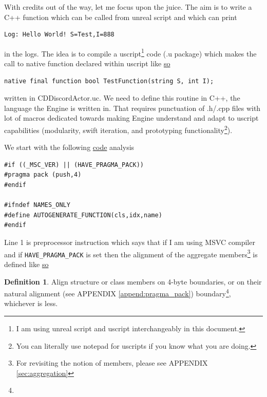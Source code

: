 \documentclass{article}
\theoremstyle{definition}
\newtheorem{definition}{Definition}[section]
\newcommand{\FileColor}[1]{{\color{Purple} #1}}
\begin{document}
With credits out of the way, let me focus upon the juice.  The aim is to write a C++ function which can be called from unreal script  and which can print

\lstset{language=[5.0]Lua}
\begin{lstlisting}[frame=single]
Log: Hello World! S=Test,I=888
\end{lstlisting}

in the logs.  The idea is to compile a uscript\footnote{I am using unreal script and uscript interchangeably in this document.} code (.u package) which makes the call to native function 
declared within uscript like \href{https://github.com/ravimohan1991/ChatDiamond/blob/f7950b2591b93a54600459ec58d7ddf57fe9218d/Classes/CDDiscordActor.uc#L43}{so}

\lstset{language=Java}
\begin{lstlisting}[frame=single]
native final function bool TestFunction(string S, int I);
\end{lstlisting}

written in \FileColor{CDDiscordActor.uc}.  We need to define this routine in C++, the language the Engine is written in.  That requires punctuation of .h/.cpp files with lot of macros dedicated towards
making Engine understand and adapt to uscript capabilities (modularity, swift iteration, and prototyping functionality\footnote{You can literally use notepad for uscripts if you know what you are doing.}).

We start with the following \href{https://github.com/ravimohan1991/ChatDiamond/blob/f7950b2591b93a54600459ec58d7ddf57fe9218d/UTNativeEssentials/ChatDiamond/Inc/ActorNativeClass.h}{code} analysis
\lstset{language=C++}
\begin{lstlisting}[frame=single]
#if ((_MSC_VER) || (HAVE_PRAGMA_PACK))
#pragma pack (push,4)
#endif

#ifndef NAMES_ONLY
#define AUTOGENERATE_FUNCTION(cls,idx,name)
#endif
\end{lstlisting}

Line 1 is preprocessor instruction which says that if I am using MSVC compiler and if \texttt{HAVE\_PRAGMA\_PACK} is set then the alignment of the aggregate members\footnote{For revisiting the notion of 
members, please see APPENDIX \ref{sec:aggregation}} is defined like \href{https://www.ibm.com/docs/en/zos/2.1.0?topic=descriptions-pragma-pack}{so}

\begin{definition}
Align structure or class members on 4-byte boundaries, or on their natural alignment (see APPENDIX \ref{append:pragma_pack}) boundary\footnote{}, whichever is less.
\end{definition}
\end{document}
